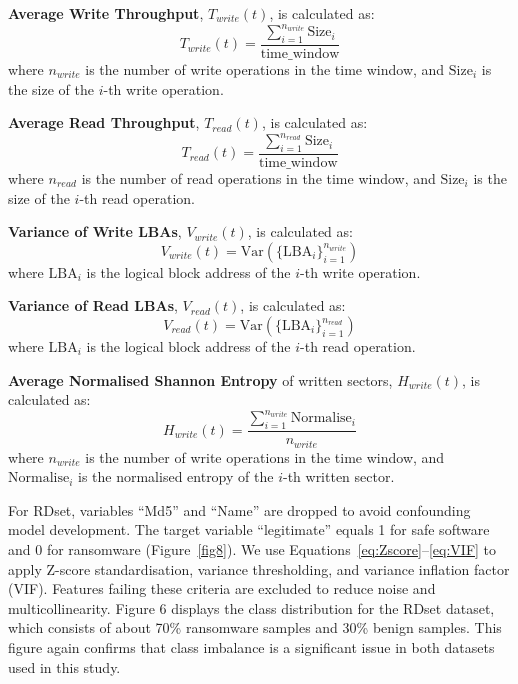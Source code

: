 \textbf{Average Write Throughput}, $T_{write}(t)$, is calculated as:
    \begin{equation}
    \label{eq:throughput}
    T_{write}(t) = \frac{\sum_{i=1}^{n_{write}} \text{Size}_i}{\text{time\_window}}
    \end{equation}
    where $n_{write}$ is the number of write operations in the time window, and $\text{Size}_i$ is the size of the $i$-th write operation.
    
\textbf{Average Read Throughput}, $T_{read}(t)$, is calculated as:
        \begin{equation}
        \label{eq:Avthroughput}
        T_{read}(t) = \frac{\sum_{i=1}^{n_{read}} \text{Size}_i}{\text{time\_window}}
        \end{equation}
        where $n_{read}$ is the number of read operations in the time window, and $\text{Size}_i$ is the size of the $i$-th read operation.
        
\textbf{Variance of Write LBAs}, $V_{write}(t)$, is calculated as:
    \begin{equation}
    \label{eq:VwriteLBA}
    V_{write}(t) = \text{Var}(\{\text{LBA}_i\}_{i=1}^{n_{write}})
    \end{equation}
    where $\text{LBA}_i$ is the logical block address of the $i$-th write operation.
    
\textbf{Variance of Read LBAs}, $V_{read}(t)$, is calculated as:
    \begin{equation}
    \label{eq:VreadLBA}
    V_{read}(t) = \text{Var}(\{\text{LBA}_i\}_{i=1}^{n_{read}})
    \end{equation}
    where $\text{LBA}_i$ is the logical block address of the $i$-th read operation.
    
\textbf{Average Normalised Shannon Entropy} of written sectors, $H_{write}(t)$, is calculated as:
    \begin{equation}
    \label{eq:NShanonEntropy}
    H_{write}(t) = \frac{\sum_{i=1}^{n_{write}} \text{Normalise}_i}{n_{write}}
    \end{equation}
    where $n_{write}$ is the number of write operations in the time window, and $\text{Normalise}_i$ is the normalised entropy of the $i$-th written sector.


 For RDset, variables ``Md5'' and ``Name'' are dropped  to avoid confounding model development. The target variable ``legitimate'' equals 1 for safe software and 0 for ransomware (Figure~\ref{fig8}). We use Equations~\ref{eq:Zscore}--\ref{eq:VIF} to apply Z-score standardisation, variance thresholding, and variance inflation factor (VIF). Features failing these criteria are excluded to reduce noise and multicollinearity. Figure 6 displays the class distribution for the RDset dataset, which consists of about 70\% ransomware samples and 30\% benign samples. This figure again confirms that class imbalance is a significant issue in both datasets used in this study.


